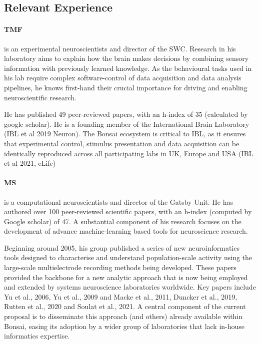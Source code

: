 
\subsection*{Relevant Experience}

\paragraph{TMF} is an experimental
neuroscientists and director of the SWC. Research in his laboratory aims to
explain how the brain makes decisions by combining sensory information with
previously learned knowledge.  As the behavioural tasks used in his lab require
complex software-control of data acquisition and data analysis pipelines, he
knows first-hand their crucial importance for driving and enabling
neuroscientific research.

He has published 49 peer-reviewed papers, with an h-index of 35 (calculated by
google scholar).  He is a founding member of the International Brain Laboratory
(IBL et al 2019 Neuron). The Bonsai ecosystem is critical to IBL, as it ensures
that experimental control, stimulus presentation and data acquisition can be
identically reproduced across all participating labs in UK, Europe and USA (IBL
et al 2021, eLife)

\paragraph{MS} is a computational neuroscientists and director of the Gatsby
Unit. He has authored over 100 peer-reviewed scientific papers, with an h-index
(computed by Google scholar) of 47. A substantial component of his research
focuses on the development of advance machine-learning based tools for
neuroscience research.

Beginning around 2005, his group published a series of new neuroinformatics
tools designed to characterise and understand population-scale activity using
the large-scale multielectrode recording methods being developed. These papers
provided the backbone for a new analytic approach that is now being employed
and extended by systems neuroscience laboratories worldwide.
%
Key papers include Yu et al., 2006, Yu et al., 2009 and Macke et al., 2011,
Duncker et al., 2019, Rutten et al., 2020 and Soulat et al., 2021.
%
A central component of the current proposal is to disseminate this approach
(and others) already available within Bonsai, easing its adoption by a wider
group of laboratories that lack in-house informatics expertise.


